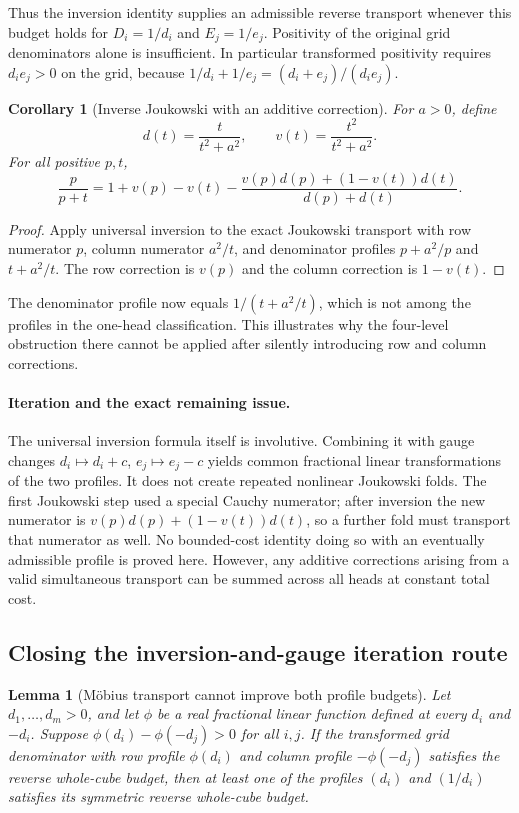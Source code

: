 \documentclass[11pt]{article}
\newtheorem{corollary}{Corollary}
\newtheorem{lemma}{Lemma}
\begin{document}
Thus the inversion identity supplies an admissible reverse transport
whenever this budget holds for $D_i=1/d_i$ and $E_j=1/e_j$.
Positivity of the original grid denominators alone is insufficient.
In particular transformed positivity requires $d_ie_j>0$ on the
grid, because $1/d_i+1/e_j=(d_i+e_j)/(d_ie_j)$.

\begin{corollary}[Inverse Joukowski with an additive correction]
For $a>0$, define
\[
 d(t)=\frac{t}{t^2+a^2},\qquad
 v(t)=\frac{t^2}{t^2+a^2}.
\]
For all positive $p,t$,
\[
 \frac p{p+t}
 =1+v(p)-v(t)
  -\frac{v(p)d(p)+(1-v(t))d(t)}{d(p)+d(t)}.
\]
\end{corollary}

\begin{proof}
Apply universal inversion to the exact Joukowski transport with
row numerator $p$, column numerator $a^2/t$, and denominator
profiles $p+a^2/p$ and $t+a^2/t$. The row correction is $v(p)$
and the column correction is $1-v(t)$.
\end{proof}

The denominator profile now equals $1/(t+a^2/t)$, which is not among
the profiles in the one-head classification. This illustrates why
the four-level obstruction there cannot be applied after silently
introducing row and column corrections.

\paragraph{Iteration and the exact remaining issue.}
The universal inversion formula itself is involutive. Combining it
with gauge changes $d_i\mapsto d_i+c$, $e_j\mapsto e_j-c$ yields
common fractional linear transformations of the two profiles.
It does not create repeated nonlinear Joukowski folds. The first
Joukowski step used a special Cauchy numerator; after inversion the
new numerator is $v(p)d(p)+(1-v(t))d(t)$, so a further fold must
transport that numerator as well. No bounded-cost identity doing
so with an eventually admissible profile is proved here. However,
any additive corrections arising from a valid simultaneous
transport can be summed across all heads at constant total cost.

\subsection{Closing the inversion-and-gauge iteration route}

\begin{lemma}[M\"obius transport cannot improve both profile budgets]
Let $d_1,\ldots,d_m>0$, and let $\phi$ be a real fractional linear
function defined at every $d_i$ and $-d_i$. Suppose
$\phi(d_i)-\phi(-d_j)>0$ for all $i,j$. If the transformed grid
denominator with row profile $\phi(d_i)$ and column profile
$-\phi(-d_j)$ satisfies the reverse whole-cube budget, then at least
one of the profiles $(d_i)$ and $(1/d_i)$ satisfies its symmetric
reverse whole-cube budget.
\end{lemma}
\end{document}
